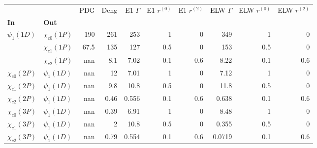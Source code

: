 \begin{tabular}{l|l|r|r|r|r|r|r|r|r}
\toprule
                &                &  PDG &  Deng &  E1-$\Gamma$ &  E1-$r^{(0)}$ &  E1-$r^{(2)}$ &  ELW-$\Gamma$ &  ELW-$r^{(0)}$ &  ELW-$r^{(2)}$ \\
\textbf{In} & \textbf{Out} &      &       &              &               &               &               &                &                \\
\midrule
\textbf{$\psi_{1}(1D)$} & \textbf{$\chi_{c0}(1P)$} &  190 &   261 &          253 &             1 &             0 &           349 &              1 &              0 \\
                & \textbf{$\chi_{c1}(1P)$} & 67.5 &   135 &          127 &           0.5 &             0 &           153 &            0.5 &              0 \\
                & \textbf{$\chi_{c2}(1P)$} &  nan &   8.1 &         7.02 &           0.1 &           0.6 &          8.22 &            0.1 &            0.6 \\
\textbf{$\chi_{c0}(2P)$} & \textbf{$\psi_{1}(1D)$} &  nan &    12 &         7.01 &             1 &             0 &          7.12 &              1 &              0 \\
\textbf{$\chi_{c1}(2P)$} & \textbf{$\psi_{1}(1D)$} &  nan &   9.8 &         10.8 &           0.5 &             0 &          11.8 &            0.5 &              0 \\
\textbf{$\chi_{c2}(2P)$} & \textbf{$\psi_{1}(1D)$} &  nan &  0.46 &        0.556 &           0.1 &           0.6 &         0.638 &            0.1 &            0.6 \\
\textbf{$\chi_{c0}(3P)$} & \textbf{$\psi_{1}(1D)$} &  nan &  0.39 &         6.91 &             1 &             0 &          8.48 &              1 &              0 \\
\textbf{$\chi_{c1}(3P)$} & \textbf{$\psi_{1}(1D)$} &  nan &     2 &         10.8 &           0.5 &             0 &         0.355 &            0.5 &              0 \\
\textbf{$\chi_{c2}(3P)$} & \textbf{$\psi_{1}(1D)$} &  nan &  0.79 &        0.554 &           0.1 &           0.6 &        0.0719 &            0.1 &            0.6 \\
\bottomrule
\end{tabular}
